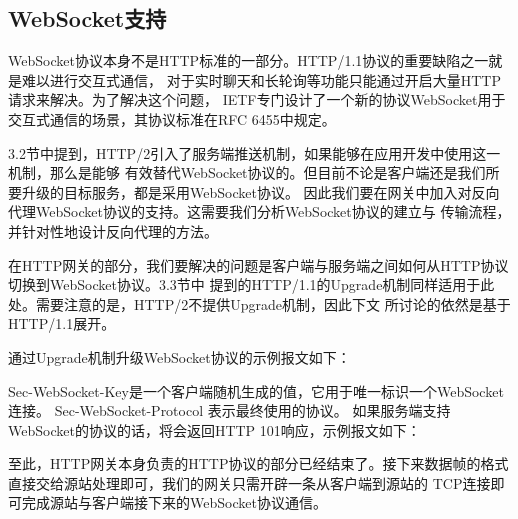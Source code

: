 \documentclass[twoside]{CUGThesis}
\begin{document}
	\subsection{WebSocket支持}
	WebSocket协议本身不是HTTP标准的一部分。HTTP/1.1协议的重要缺陷之一就是难以进行交互式通信，
	对于实时聊天和长轮询等功能只能通过开启大量HTTP请求来解决。为了解决这个问题，
	IETF专门设计了一个新的协议WebSocket用于交互式通信的场景，其协议标准在RFC 6455中规定\cite{fette2011websocket}。\par
	3.2节中提到，HTTP/2引入了服务端推送机制，如果能够在应用开发中使用这一机制，那么是能够
	有效替代WebSocket协议的。但目前不论是客户端还是我们所要升级的目标服务，都是采用WebSocket协议。
	因此我们要在网关中加入对反向代理WebSocket协议的支持。这需要我们分析WebSocket协议的建立与
	传输流程，并针对性地设计反向代理的方法。\par
	在HTTP网关的部分，我们要解决的问题是客户端与服务端之间如何从HTTP协议切换到WebSocket协议。3.3节中
	提到的HTTP/1.1的Upgrade机制同样适用于此处。需要注意的是，HTTP/2不提供Upgrade机制，因此下文
	所讨论的依然是基于HTTP/1.1展开。\par
	通过Upgrade机制升级WebSocket协议的示例报文如下：\\ 
	 \par
	Sec-WebSocket-Key是一个客户端随机生成的值，它用于唯一标识一个WebSocket连接。
    Sec-WebSocket-Protocol 表示最终使用的协议。	
	如果服务端支持WebSocket的协议的话，将会返回HTTP 101响应，示例报文如下：\\
	 \par
	至此，HTTP网关本身负责的HTTP协议的部分已经结束了。接下来数据帧的格式直接交给源站处理即可，我们的网关只需开辟一条从客户端到源站的
	TCP连接即可完成源站与客户端接下来的WebSocket协议通信。
\end{document}
